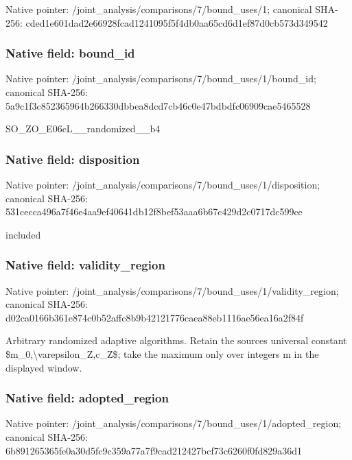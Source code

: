 \documentclass[10pt,a4paper]{article}
\begin{document}
Native pointer: /joint\_analysis/comparis\allowbreak{}ons/7/bound\_uses/1; canonical SHA-256: cded1e601dad2e66928fcad1\allowbreak{}241095f5f4db0aa65cd6d1ef\allowbreak{}87d0cb573d349542



\subsubsection{Native field: bound\_id}


Native pointer: /joint\_analysis/comparis\allowbreak{}ons/7/bound\_uses/1/bound\allowbreak{}\_id; canonical SHA-256: 5a9c1f3c852365964b266330\allowbreak{}dbbea8dcd7cb46c0e47bdbdf\allowbreak{}c06909cae5465528


SO\_ZO\_E06cL\_\_randomized\_\_b4


\subsubsection{Native field: disposition}


Native pointer: /joint\_analysis/comparis\allowbreak{}ons/7/bound\_uses/1/dispo\allowbreak{}sition; canonical SHA-256: 531cecca496a7f46e4aa9ef4\allowbreak{}0641db12f8bef53aaa6b67c4\allowbreak{}29d2c0717dc599ce


included


\subsubsection{Native field: validity\_region}


Native pointer: /joint\_analysis/comparis\allowbreak{}ons/7/bound\_uses/1/valid\allowbreak{}ity\_region; canonical SHA-256: d02ca0166b361e874c0b52af\allowbreak{}fc8b9b42121776caea88eb11\allowbreak{}16ae56ea16a2f84f


Arbitrary randomized adaptive algorithms. Retain the sources universal constant \$m\_0,\textbackslash{}varepsilon\_Z,c\_Z\$; take the maximum only over integers m in the displayed window.


\subsubsection{Native field: adopted\_region}


Native pointer: /joint\_analysis/comparis\allowbreak{}ons/7/bound\_uses/1/adopt\allowbreak{}ed\_region; canonical SHA-256: 6b891265365fe0a30d5fc9c3\allowbreak{}59a77a7f9cad212427bcf73c\allowbreak{}6260f0fd829a36d1
\end{document}
